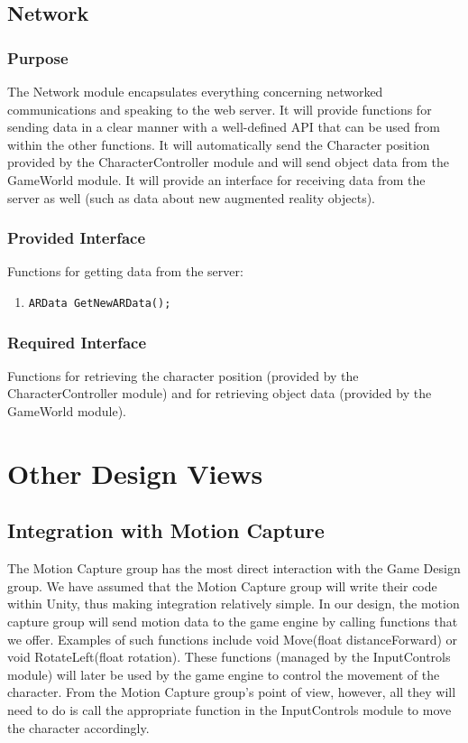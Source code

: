 \documentclass[10pt,letterpaper,oneside,english]{article}
\newcommand{\code}[1]{\texttt{#1}}
\newcommand{\citem}[1]{\item \code{#1}}
\begin{document}
\subsection{Network}

\subsubsection{Purpose}
	The Network module encapsulates everything concerning networked communications and speaking to the web server. It will provide functions for sending data in a clear manner with a well-defined API that can be used from within the other functions. It will automatically send the Character position provided by the CharacterController module and will send object data from the GameWorld module. It will provide an interface for receiving data from the server as well (such as data about new augmented reality objects).

\subsubsection{Provided Interface}
Functions for getting data from the server:
\begin{enumerate}
\citem {ARData GetNewARData();}
\end{enumerate}

\subsubsection{Required Interface}
	Functions for retrieving the character position (provided by the CharacterController module) and for retrieving object data (provided by the GameWorld module).

\section{Other Design Views} 


\subsection{Integration with Motion Capture}

The Motion Capture group has the most direct interaction with the Game Design group. We have assumed that the Motion Capture group will write their code within Unity, thus making integration relatively simple. In our design, the motion capture group will send motion data to the game engine by calling functions that we offer. Examples of such functions include void Move(float distanceForward) or void RotateLeft(float rotation). These functions (managed by the InputControls module) will later be used by the game engine to control the movement of the character. From the Motion Capture group’s point of view, however, all they will need to do is call the appropriate function in the InputControls module to move the character accordingly.
\end{document}
